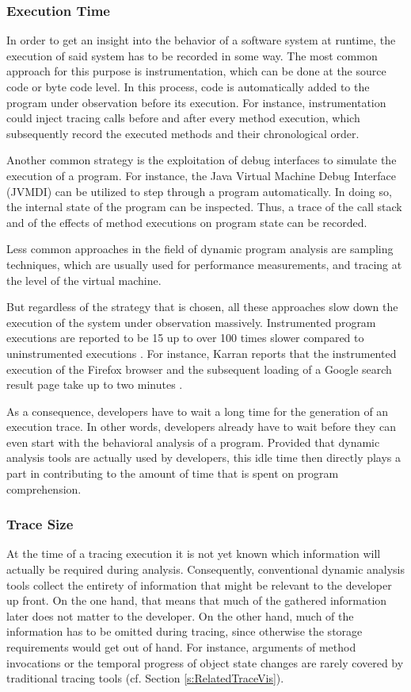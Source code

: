 \subsubsection{Execution Time}
In order to get an insight into the behavior of a software system at runtime, the execution of said system has to be recorded in some way.
The most common approach for this purpose is instrumentation, which can be done at the source code or byte code level.
In this process, code is automatically added to the program under observation before its execution.
For instance, instrumentation could inject tracing calls before and after every method execution, which subsequently record the executed methods and their chronological order.

Another common strategy is the exploitation of debug interfaces to simulate the execution of a program.
For instance, the Java Virtual Machine Debug Interface (JVMDI) can be utilized to step through a program automatically.
In doing so, the internal state of the program can be inspected.
Thus, a trace of the call stack and of the effects of method executions on program state can be recorded.

Less common approaches in the field of dynamic program analysis are sampling techniques, which are usually used for performance measurements, and tracing at the level of the virtual machine.

But regardless of the strategy that is chosen, all these approaches slow down the execution of the system under observation massively.
Instrumented program executions are reported to be 15 up to over 100 times slower compared to uninstrumented executions \cite{pothier_scalable_2007, karran_synctrace:_2013}.
For instance, Karran reports that the instrumented execution of the Firefox browser and the subsequent loading of a Google search result page take up to two minutes \cite{karran_extraction_2013}.

As a consequence, developers have to wait a long time for the generation of an execution trace.
In other words, developers already have to wait before they can even start with the behavioral analysis of a program.
Provided that dynamic analysis tools are actually used by developers, this idle time then directly plays a part in contributing to the amount of time that is spent on program comprehension.

\subsubsection{Trace Size}
At the time of a tracing execution it is not yet known which information will actually be required during analysis.
Consequently, conventional dynamic analysis tools collect the entirety of information that might be relevant to the developer up front.
On the one hand, that means that much of the gathered information later does not matter to the developer.
On the other hand, much of the information has to be omitted during tracing, since otherwise the storage requirements would get out of hand.
For instance, arguments of method invocations or the temporal progress of object state changes are rarely covered by traditional tracing tools (cf. Section \ref{s:RelatedTraceVis}).


